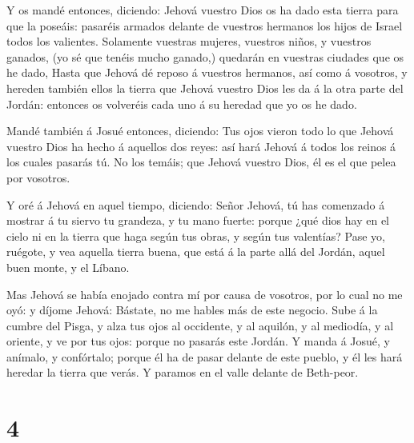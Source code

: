  Y os mandé entonces, diciendo: Jehová vuestro Dios os ha
dado esta tierra para que la poseáis: pasaréis armados delante de
vuestros hermanos los hijos de Israel todos los valientes. 
Solamente vuestras mujeres, vuestros niños, y vuestros ganados, (yo sé
que tenéis mucho ganado,) quedarán en vuestras ciudades que os he dado,
 Hasta que Jehová dé reposo á vuestros hermanos, así como á
vosotros, y hereden también ellos la tierra que Jehová vuestro Dios les
da á la otra parte del Jordán: entonces os volveréis cada uno á su
heredad que yo os he dado.

 Mandé también á Josué entonces, diciendo: Tus ojos vieron
todo lo que Jehová vuestro Dios ha hecho á aquellos dos reyes: así hará
Jehová á todos los reinos á los cuales pasarás tú.  No los
temáis; que Jehová vuestro Dios, él es el que pelea por vosotros.

 Y oré á Jehová en aquel tiempo, diciendo: 
Señor Jehová, tú has comenzado á mostrar á tu siervo tu grandeza, y tu
mano fuerte: porque ¿qué dios hay en el cielo ni en la tierra que haga
según tus obras, y según tus valentías?  Pase yo, ruégote,
y vea aquella tierra buena, que está á la parte allá del Jordán, aquel
buen monte, y el Líbano.

 Mas Jehová se había enojado contra mí por causa de
vosotros, por lo cual no me oyó: y díjome Jehová: Bástate, no me hables
más de este negocio.  Sube á la cumbre del Pisga, y alza
tus ojos al occidente, y al aquilón, y al mediodía, y al oriente, y ve
por tus ojos: porque no pasarás este Jordán.  Y manda á
Josué, y anímalo, y confórtalo; porque él ha de pasar delante de este
pueblo, y él les hará heredar la tierra que verás.  Y
paramos en el valle delante de Beth-peor.

\hypertarget{section-3}{%
\section{4}\label{section-3}}

